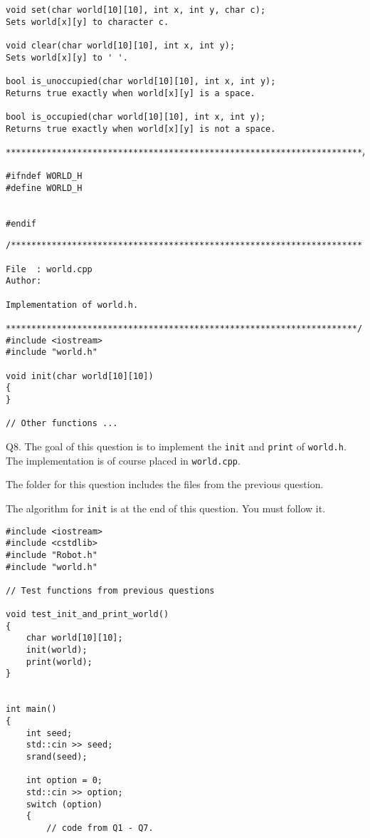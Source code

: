 {{\begin{Verbatim}[frame=single]
void set(char world[10][10], int x, int y, char c);
Sets world[x][y] to character c.

void clear(char world[10][10], int x, int y);
Sets world[x][y] to ' '.

bool is_unoccupied(char world[10][10], int x, int y);
Returns true exactly when world[x][y] is a space.

bool is_occupied(char world[10][10], int x, int y);
Returns true exactly when world[x][y] is not a space.

**********************************************************************/

#ifndef WORLD_H
#define WORLD_H


#endif
\end{Verbatim}
\begin{Verbatim}[frame=single]
/*********************************************************************

File  : world.cpp
Author:

Implementation of world.h.

*********************************************************************/
#include <iostream>
#include "world.h"

void init(char world[10][10])
{
}

// Other functions ...

\end{Verbatim}
}


\newpage
Q8. 
The goal of this question is to implement the
\verb!init! and \verb!print!
of \verb!world.h!.
The implementation is of course placed in
\verb!world.cpp!.

The folder for this question
includes the files from the previous question.

The algorithm for \verb!init! is at the end of this question.
You must follow it.

{\small
\begin{Verbatim}[frame=single]
#include <iostream>
#include <cstdlib>
#include "Robot.h"
#include "world.h"

// Test functions from previous questions

void test_init_and_print_world()
{
    char world[10][10];
    init(world);
    print(world);
}


int main()
{
    int seed;
    std::cin >> seed;
    srand(seed);
    
    int option = 0;
    std::cin >> option;
    switch (option)
    {
        // code from Q1 - Q7.


\end{Verbatim}}}

